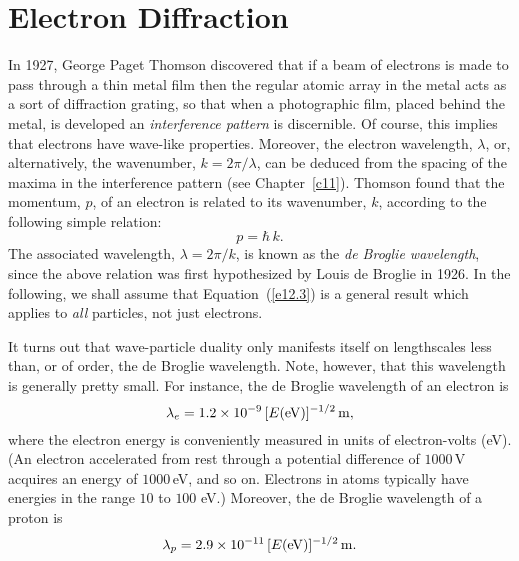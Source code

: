 \section{Electron Diffraction}\label{s12.3}
In 1927, George Paget Thomson discovered that if a beam of electrons
is made to pass through a thin metal film then the regular atomic array in  the metal acts as a
sort of diffraction grating, so that when a photographic film, placed behind the metal, is developed an
{\em interference pattern}\/ is discernible. Of course, this implies that electrons have wave-like
properties. Moreover, the electron wavelength, $\lambda$,  or, alternatively, the wavenumber, $k =2\pi/\lambda$, can be deduced from the spacing
of the maxima in the interference pattern (see Chapter~\ref{c11}).
Thomson found that the momentum, $p$, of an electron is related to its wavenumber, $k$, according to the
following
simple relation:
\begin{equation}\label{e12.3}
p = \hbar\,k.
\end{equation}
The associated wavelength, $\lambda = 2\pi/k$, is known as the {\em de Broglie wavelength}, since the above
relation was first hypothesized   by Louis de Broglie in 1926.
In the following, we shall assume that Equation~(\ref{e12.3}) is a general result which applies to {\em all}\/ particles,  not just electrons.

It turns out that wave-particle duality only manifests itself on lengthscales less than,
or of order, the de Broglie wavelength. Note, however, that this wavelength is generally pretty small. For instance,
the de Broglie wavelength of an electron is
\begin{equation}
\lambda_e = 1.2\times 10^{-9}\,[E({\rm eV})]^{-1/2}\,{\rm m},
\end{equation}
where the electron energy is conveniently measured in units of electron-volts (eV). 
(An electron accelerated from rest through a potential difference of $1000$\,V
acquires an energy of $1000$\,eV, and so on. Electrons in atoms typically have energies in the range $10$ to $100$ eV.) Moreover, the de Broglie wavelength
of a proton is
\begin{equation}
\lambda_p = 2.9\times 10^{-11}\,[E({\rm eV})]^{-1/2}\,{\rm m}.
\end{equation}

